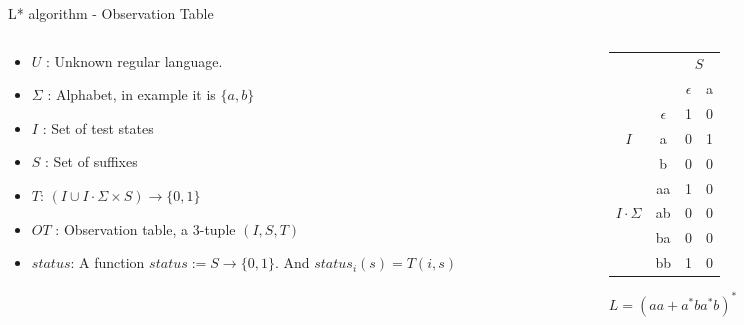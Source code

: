 \documentclass{beamer}
\begin{document}
\begin{frame}{L* algorithm - Observation Table }
    \begin{columns}[T]
        \begin{column}{0.6\textwidth}
            \begin{itemize}
                \item $U$ : Unknown regular language. 
                \item $\Sigma$ : Alphabet, in example it is $\{a,b\}$
                \item $I$ : Set of test states
                \item $S$ : Set of suffixes
                \item $T$: $(I \cup I \cdot \Sigma \times S) \to \{0,1\}$
                \item $OT$ : {\small Observation table, a 3-tuple } $(I,S,T)$
                \item $status$: A function $status:= S \rightarrow\{0,1\}$. And $status_i(s) = T(i,s)$
            \end{itemize}
        \end{column}

        \begin{column}{0.6\textwidth}
            \centering
            \begin{tabular}{cc|c|c}
                &   & \multicolumn{2}{c}{$S$} \\ 
                \multicolumn{2}{c|}{} & $\epsilon$ & a \\ \hline
                & $\epsilon$ & 1 & 0 \\
                {$I$}& a          & 0 & 1 \\
                & b          & 0 & 0 \\\hline
                
                & aa& 1& 0 \\
                {$I\cdot \Sigma$}        & ab& 0&0\\
                & ba         & 0 & 0 \\
                & bb         & 1 & 0 \\ 
            \end{tabular}
            \par \vspace{0.2cm} 
            {\footnotesize $L = (aa + a^* b a^* b)^*$}
        \end{column}
    \end{columns}
\end{frame}
\end{document}
